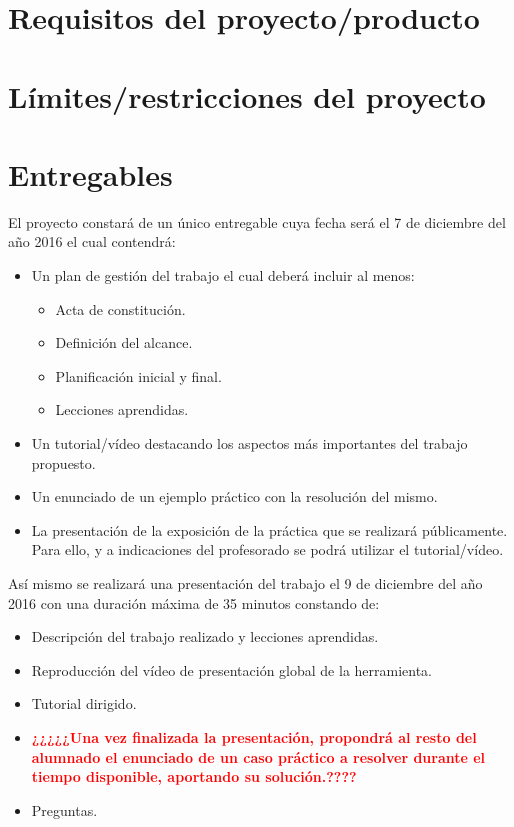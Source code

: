 \documentclass[a4paper,10pt]{scrartcl}
\begin{document}
\section{Requisitos del proyecto/producto}

\section{Límites/restricciones del proyecto}

\section{Entregables}

El proyecto constará de un único entregable cuya fecha será el 7 de diciembre del año 2016 el cual contendrá:
	\begin{itemize}
		\item Un plan de gestión del trabajo el cual deberá incluir al menos:
		
		\begin{itemize}
			\item Acta de constitución.
			\item Definición del alcance.
			\item Planificación inicial y final.
			\item Lecciones aprendidas.
		\end{itemize}
		
		\item Un tutorial/vídeo destacando los aspectos más importantes del trabajo propuesto.
		
		\item Un enunciado de un ejemplo práctico con la resolución del mismo.
		
		\item La presentación de la exposición de la práctica que se realizará públicamente. Para ello, y a indicaciones del profesorado se podrá utilizar el tutorial/vídeo.		
	\end{itemize}

Así mismo se realizará una presentación del trabajo el 9 de diciembre del año 2016 con una duración máxima de 35 minutos constando de:
\begin{itemize}
	\item Descripción del trabajo realizado y lecciones aprendidas.
	
	\item Reproducción del vídeo de presentación global de la herramienta.
	
	\item Tutorial dirigido.
	
	\item \textbf{\textcolor{red}{¿¿¿¿¿Una vez finalizada la presentación, propondrá al resto del alumnado el enunciado de un caso práctico a resolver durante el tiempo disponible, aportando su solución.????}}
	
	\item Preguntas.


\end{itemize}
\end{document}
